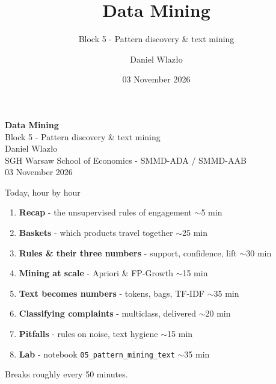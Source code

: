 \documentclass[10pt,aspectratio=169]{beamer}
\title[Data Mining]{Data Mining}
\subtitle{Block 5 - Pattern discovery \& text mining}
\author{Daniel Wlazło}
\institute{SGH Warsaw School of Economics - SMMD-ADA / SMMD-AAB}
\date{03 November 2026}
\begin{document}
\begin{frame}[plain]
  \begin{center}
    \vspace{1cm}
    {\LARGE\textbf{Data Mining}}\\[0.5cm]
    {\large Block 5 - Pattern discovery \& text mining}\\[1.5cm]
    {\large Daniel Wlazło} \\[0.2cm]
    {\small SGH Warsaw School of Economics - SMMD-ADA / SMMD-AAB} \\[0.2cm]
    {\small 03 November 2026}
  \end{center}
\end{frame}

\begin{frame}{Today, hour by hour}
  \begin{enumerate}
    \item \textbf{Recap} - the unsupervised rules of engagement \hfill {\small$\sim$5 min}
    \item \textbf{Baskets} - which products travel together \hfill {\small$\sim$25 min}
    \item \textbf{Rules \& their three numbers} - support, confidence, lift \hfill {\small$\sim$30 min}
    \item \textbf{Mining at scale} - Apriori \& FP-Growth \hfill {\small$\sim$15 min}
    \item \textbf{Text becomes numbers} - tokens, bags, TF-IDF \hfill {\small$\sim$35 min}
    \item \textbf{Classifying complaints} - multiclass, delivered \hfill {\small$\sim$20 min}
    \item \textbf{Pitfalls} - rules on noise, text hygiene \hfill {\small$\sim$15 min}
    \item \textbf{Lab} - notebook \texttt{05\_pattern\_mining\_text} \hfill {\small$\sim$35 min}
  \end{enumerate}
  \vspace{0.3em}
  \begin{center}\small Breaks roughly every 50 minutes.\end{center}
\end{frame}
\end{document}
